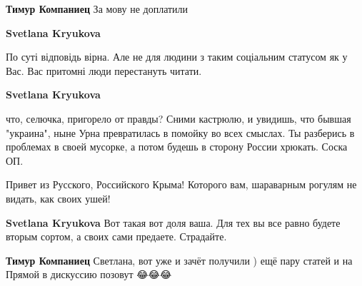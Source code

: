 \begin{itemize}
\begin{itemize}
\textbf{Тимур Компаниец} За мову не доплатили

 
\textbf{Svetlana Kryukova} 

По суті відповідь вірна. Але не для людини з таким соціальним статусом як у
Вас. Вас притомні люди перестануть читати.


\par
 
\textbf{Svetlana Kryukova} 

что, селючка, пригорело от правды? Сними кастрюлю, и увидишь, что бывшая
"украина", ныне Урна превратилась в помойку во всех смыслах. Ты разберись в
проблемах в своей мусорке, а потом будешь в сторону России хрюкать. Соска ОП.

Привет из Русского, Российского Крыма! Которого вам, шараварным рогулям не
видать, как своих ушей!

 
\textbf{Svetlana Kryukova} Вот такая вот доля ваша. Для тех вы все равно будете вторым сортом, а своих сами предаете. Страдайте.

 
\textbf{Тимур Компаниец} Светлана, вот уже и зачёт получили ) ещё пару статей и на Прямой в дискуссию позовут 😂😂😂

 

\end{itemize}
\end{itemize}
